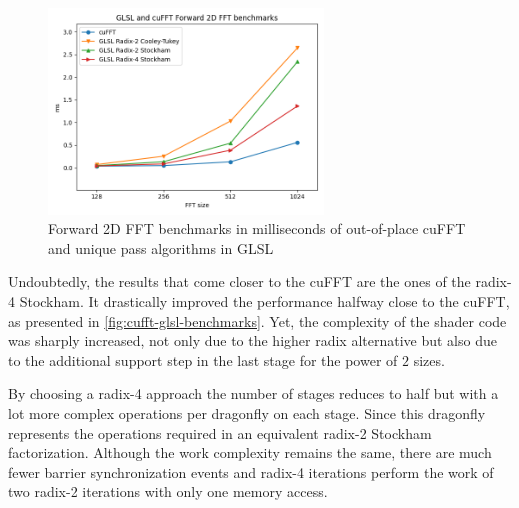 \documentclass[
  oneside,
  11pt, a4paper,
  footinclude=true,
  headinclude=true,
  cleardoublepage=empty
]{scrbook}
\begin{document}

\begin{figure}[h!] 
    \centering
    \includegraphics[width=0.65\textwidth]{img/results/cufft_glsl_benchmarks.png}
    \caption{Forward 2D FFT benchmarks in milliseconds of out-of-place cuFFT and unique pass algorithms in GLSL}
    \label{fig:cufft-glsl-benchmarks}
\end{figure}

Undoubtedly, the results that come closer to the cuFFT are the ones of the radix-4 Stockham. It drastically improved the performance halfway close to the cuFFT, as presented in \autoref{fig:cufft-glsl-benchmarks}. Yet, the complexity of the shader code was sharply increased, not only due to the higher radix alternative but also due to the additional support step in the last stage for the power of $2$ sizes.

By choosing a radix-4 approach the number of stages reduces to half but with a lot more complex operations per dragonfly on each stage. Since this dragonfly represents the operations required in an equivalent radix-2 Stockham factorization. Although the work complexity remains the same, there are much fewer barrier synchronization events and radix-4 iterations perform the work of two radix-2 iterations with only one memory access.
\end{document}
